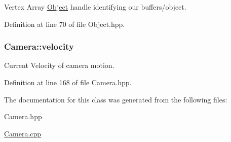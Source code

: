 Vertex Array \hyperlink{class_object}{Object} handle identifying our buffers/object. 



Definition at line 70 of file Object.\-hpp.

\hypertarget{class_camera_a5b95c890f213db50f321380108b17ea1}{
\subsubsection[{velocity}]{ Camera\-::velocity\hspace{0.3cm}{\ttfamily [private]}}}\label{class_camera_a5b95c890f213db50f321380108b17ea1}


Current Velocity of camera motion. 



Definition at line 168 of file Camera.\-hpp.



The documentation for this class was generated from the following files\-:\begin{DoxyCompactItemize}
\item 
Camera.\-hpp\item 
\hyperlink{_camera_8cpp}{Camera.\-cpp}\end{DoxyCompactItemize}

